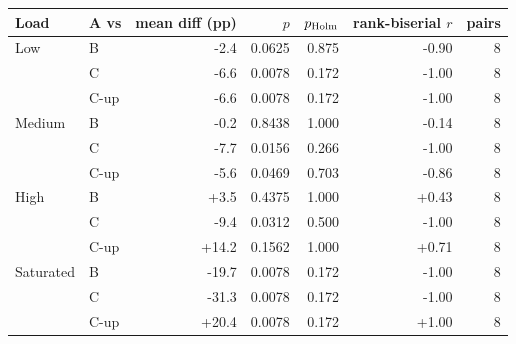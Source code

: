 \begin{tabular}{@{}llrrrrr@{}}\toprule
Load & A vs & mean diff (pp) & $p$ & $p_{\rm Holm}$ & rank-biserial $r$ & pairs\\\midrule
Low & B & -2.4 & 0.0625 & 0.875 & -0.90 & 8\\
 & C & -6.6 & 0.0078 & 0.172 & -1.00 & 8\\
 & C-up & -6.6 & 0.0078 & 0.172 & -1.00 & 8\\
Medium & B & -0.2 & 0.8438 & 1.000 & -0.14 & 8\\
 & C & -7.7 & 0.0156 & 0.266 & -1.00 & 8\\
 & C-up & -5.6 & 0.0469 & 0.703 & -0.86 & 8\\
High & B & +3.5 & 0.4375 & 1.000 & +0.43 & 8\\
 & C & -9.4 & 0.0312 & 0.500 & -1.00 & 8\\
 & C-up & +14.2 & 0.1562 & 1.000 & +0.71 & 8\\
Saturated & B & -19.7 & 0.0078 & 0.172 & -1.00 & 8\\
 & C & -31.3 & 0.0078 & 0.172 & -1.00 & 8\\
 & C-up & +20.4 & 0.0078 & 0.172 & +1.00 & 8\\
\bottomrule\end{tabular}